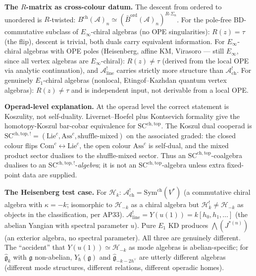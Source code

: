 \documentclass[11pt]{article}
\newcommand{\cA}{\mathcal{A}}
\newcommand{\cH}{\mathcal{H}}
\newcommand{\fg}{\mathfrak{g}}
\begin{document}
\medskip\noindent\textbf{The $R$-matrix as cross-colour datum.}\enspace
The descent from ordered to unordered is $R$-twisted:
$B^{\mathrm{ch}}(\cA)_n \simeq
(\bar{B}^{\mathrm{ord}}(\cA)_n)^{R\text{-}\Sigma_n}$.
For the pole-free BD-commutative subclass of
$E_\infty$-chiral algebras (no OPE singularities):
$R(z) = \tau$ (the flip), descent is trivial, both
duals carry equivalent information.  For
$E_\infty$-chiral algebras with OPE poles
(Heisenberg, affine KM, Virasoro --- still $E_\infty$,
since all vertex algebras are $E_\infty$-chiral):
$R(z) \neq \tau$ (derived from the local OPE via
analytic continuation), and $\cA^!_{\mathrm{line}}$
carries strictly more structure than
$\cA^!_{\mathrm{ch}}$.  For genuinely $E_1$-chiral
algebras (nonlocal, Etingof--Kazhdan quantum vertex
algebras): $R(z) \neq \tau$ and is independent
input, not derivable from a local OPE.

\medskip\noindent\textbf{Operad-level explanation.}\enspace
At the operad level the correct statement is Koszulity, not
self-duality.  Livernet--Hoefel plus Kontsevich formality give the
homotopy-Koszul bar-cobar equivalence for
$\mathrm{SC}^{\mathrm{ch,top}}$.  The Koszul dual cooperad is
$\mathrm{SC}^{\mathrm{ch,top},!} =
(\mathrm{Lie}^{c},\mathrm{Ass}^{c},\text{shuffle-mixed})$ on the
associated graded: the closed colour flips
$\mathrm{Com}^{c}\leftrightarrow \mathrm{Lie}^{c}$, the open
colour $\mathrm{Ass}^{c}$ is self-dual, and the mixed product sector
dualises to the shuffle-mixed sector.  Thus an
$\mathrm{SC}^{\mathrm{ch,top}}$-coalgebra dualises to an
$\mathrm{SC}^{\mathrm{ch,top},!}$-\emph{algebra}; it is not an
$\mathrm{SC}^{\mathrm{ch,top}}$-algebra unless extra fixed-point data
are supplied.

\medskip\noindent\textbf{The Heisenberg test case.}\enspace
For $\cH_k$: $\cA^!_{\mathrm{ch}} = \mathrm{Sym}^{\mathrm{ch}}(V^*)$
(a commutative chiral algebra with $\kappa = -k$;
isomorphic to $\cH_{-k}$ as a chiral algebra but
$\cH_k^! \neq \cH_{-k}$ as objects in the classification,
per AP33).  $\cA^!_{\mathrm{line}} = Y(u(1)) = k[h_0, h_1, \ldots]$
(the abelian Yangian with spectral parameter $u$).
Pure $E_1$ KD produces $\bigwedge(J^{*(n)})$ (an exterior algebra,
no spectral parameter).  All three are genuinely different.
The ``accident'' that $Y(u(1)) \simeq \cH_{-k}$ as mode algebras
is abelian-specific; for $\widehat{\fg}_k$ with $\fg$ non-abelian,
$Y_\hbar(\fg)$ and $\widehat{\fg}_{-k-2h^\vee}$ are utterly
different algebras (different mode structures, different relations,
different operadic homes).
\end{document}
